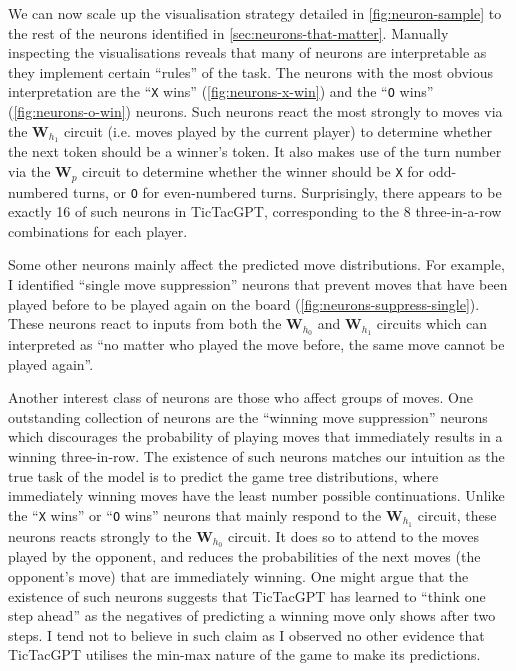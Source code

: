 \documentclass{article}
\newcommand{\ttgpt}{TicTacGPT\xspace}
\newcommand{\m}[1]{\mathbf{\bm{#1}}}
\newcounter{num}
\begin{document}
We can now scale up the visualisation strategy detailed in \cref{fig:neuron-sample} to the rest of the neurons identified in \cref{sec:neurons-that-matter}. Manually inspecting the visualisations reveals that many of neurons are interpretable as they implement certain ``rules'' of the task. The neurons with the most obvious interpretation are the ``\texttt{X} wins'' (\cref{fig:neurons-x-win}) and the ``\texttt{O} wins'' (\cref{fig:neurons-o-win}) neurons. Such neurons react the most strongly to moves via the $\m{W}_{h_1}$ circuit (i.e. moves played by the current player) to determine whether the next token should be a winner's token. It also makes use of the turn number via the $\m{W}_p$ circuit to determine whether the winner should be \texttt{X} for odd-numbered turns, or \texttt{O} for even-numbered turns. Surprisingly, there appears to be exactly 16 of such neurons in \ttgpt, corresponding to the 8 three-in-a-row combinations for each player.

Some other neurons mainly affect the predicted move distributions. For example, I identified ``single move suppression'' neurons that prevent moves that have been played before to be played again on the board (\cref{fig:neurons-suppress-single}). These neurons react to inputs from both the $\m{W}_{h_0}$ and $\m{W}_{h_1}$ circuits which can interpreted as ``no matter who played the move before, the same move cannot be played again''.

Another interest class of neurons are those who affect groups of moves. One outstanding collection of neurons are the ``winning move suppression'' neurons which discourages the probability of playing moves that immediately results in a winning three-in-row. The existence of such neurons matches our intuition as the true task of the model is to predict the game tree distributions, where immediately winning moves have the least number possible continuations. Unlike the ``\texttt{X} wins'' or ``\texttt{O} wins'' neurons that mainly respond to the $\m{W}_{h_1}$ circuit, these neurons reacts strongly to the $\m{W}_{h_0}$ circuit. It does so to attend to the moves played by the opponent, and reduces the probabilities of the next moves (the opponent's move) that are immediately winning. One might argue that the existence of such neurons suggests that \ttgpt has learned to ``think one step ahead'' as the negatives of predicting a winning move only shows after two steps. I tend not to believe in such claim as I observed no other evidence that \ttgpt utilises the min-max nature of the game to make its predictions.

\newpage


\end{document}
